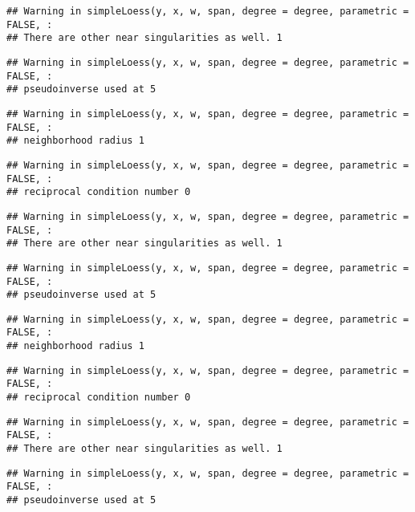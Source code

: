 \documentclass[
]{article}
\begin{document}
\begin{verbatim}
## Warning in simpleLoess(y, x, w, span, degree = degree, parametric = FALSE, :
## There are other near singularities as well. 1
\end{verbatim}

\begin{verbatim}
## Warning in simpleLoess(y, x, w, span, degree = degree, parametric = FALSE, :
## pseudoinverse used at 5
\end{verbatim}

\begin{verbatim}
## Warning in simpleLoess(y, x, w, span, degree = degree, parametric = FALSE, :
## neighborhood radius 1
\end{verbatim}

\begin{verbatim}
## Warning in simpleLoess(y, x, w, span, degree = degree, parametric = FALSE, :
## reciprocal condition number 0
\end{verbatim}

\begin{verbatim}
## Warning in simpleLoess(y, x, w, span, degree = degree, parametric = FALSE, :
## There are other near singularities as well. 1
\end{verbatim}

\begin{verbatim}
## Warning in simpleLoess(y, x, w, span, degree = degree, parametric = FALSE, :
## pseudoinverse used at 5
\end{verbatim}

\begin{verbatim}
## Warning in simpleLoess(y, x, w, span, degree = degree, parametric = FALSE, :
## neighborhood radius 1
\end{verbatim}

\begin{verbatim}
## Warning in simpleLoess(y, x, w, span, degree = degree, parametric = FALSE, :
## reciprocal condition number 0
\end{verbatim}

\begin{verbatim}
## Warning in simpleLoess(y, x, w, span, degree = degree, parametric = FALSE, :
## There are other near singularities as well. 1
\end{verbatim}

\begin{verbatim}
## Warning in simpleLoess(y, x, w, span, degree = degree, parametric = FALSE, :
## pseudoinverse used at 5
\end{verbatim}
\end{document}
